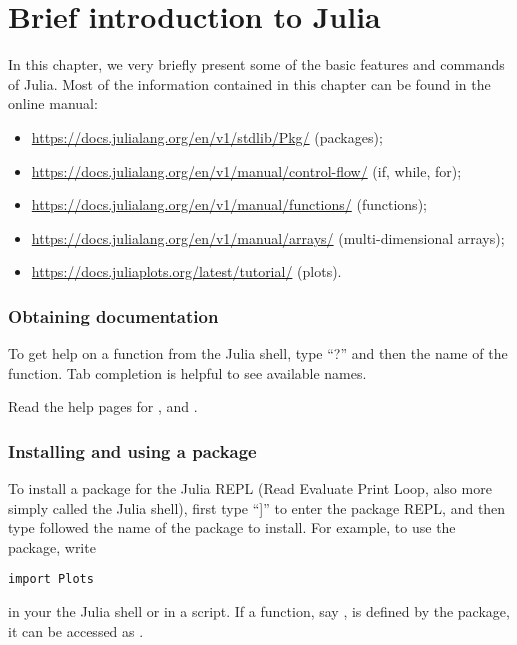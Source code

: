 \appendix
\chapter{Brief introduction to Julia}%
\label{cha:a_very_short_introduction_to_julia}

In this chapter, 
we very briefly present  some of the basic features and commands of Julia.
Most of the information contained in this chapter can be found in the online manual: 
\begin{itemize}
    \item \url{https://docs.julialang.org/en/v1/stdlib/Pkg/} (packages);
    \item \url{https://docs.julialang.org/en/v1/manual/control-flow/} (if, while, for);
    \item \url{https://docs.julialang.org/en/v1/manual/functions/} (functions);
    \item \url{https://docs.julialang.org/en/v1/manual/arrays/} (multi-dimensional arrays);
    \item \url{https://docs.juliaplots.org/latest/tutorial/} (plots).
\end{itemize}

\subsection*{Obtaining documentation}%
\label{sub:getting_documentation}

To get help on a function from the Julia shell, 
type ``?'' and then the name of the function.
Tab completion is helpful to see available names.

\begin{exercise}
    Read the help pages for ,  and .
\end{exercise}

\subsection*{Installing and using a package}%
\label{sub:installing_and_using_a_package}
To install a package for the Julia REPL (Read Evaluate Print Loop, also more simply called the Julia shell),
first type ``]'' to enter the package REPL,
and then type  followed the name of the package to install.
For example, to use the  package, write
\begin{verbatim}
import Plots
\end{verbatim}
in your the Julia shell or in a script.
If a function, say , is defined by the package,
it can be accessed as .

